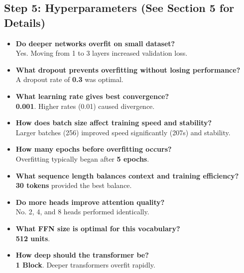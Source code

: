\documentclass[12pt,a4paper]{article}
\begin{document}
\subsection*{Step 5: Hyperparameters (See Section 5 for Details)}
\begin{itemize}
    \item \textbf{Do deeper networks overfit on small dataset?} \\ Yes. Moving from 1 to 3 layers increased validation loss.
    \item \textbf{What dropout prevents overfitting without losing performance?} \\ A dropout rate of \textbf{0.3} was optimal.
    \item \textbf{What learning rate gives best convergence?} \\ \textbf{0.001}. Higher rates (0.01) caused divergence.
    \item \textbf{How does batch size affect training speed and stability?} \\ Larger batches (256) improved speed significantly (207s) and stability.
    \item \textbf{How many epochs before overfitting occurs?} \\ Overfitting typically began after \textbf{5 epochs}.
    \item \textbf{What sequence length balances context and training efficiency?} \\ \textbf{30 tokens} provided the best balance.
    \item \textbf{Do more heads improve attention quality?} \\ No. 2, 4, and 8 heads performed identically.
    \item \textbf{What FFN size is optimal for this vocabulary?} \\ \textbf{512 units}.
    \item \textbf{How deep should the transformer be?} \\ \textbf{1 Block}. Deeper transformers overfit rapidly.
\end{itemize}

\hrulefill \\
\end{document}
